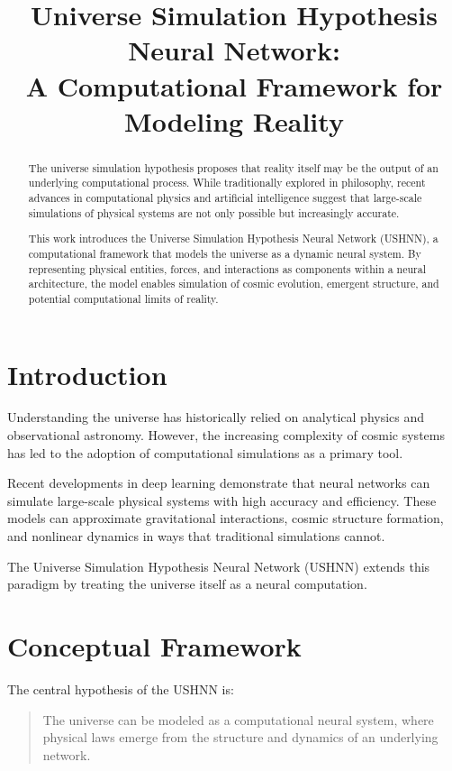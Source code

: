\documentclass[12pt]{article}
\title{\textbf{Universe Simulation Hypothesis Neural Network: \\ A Computational Framework for Modeling Reality}}
\author{}
\date{}
\begin{document}
\maketitle

\begin{abstract}
The universe simulation hypothesis proposes that reality itself may be the output of an underlying computational process. While traditionally explored in philosophy, recent advances in computational physics and artificial intelligence suggest that large-scale simulations of physical systems are not only possible but increasingly accurate.

This work introduces the Universe Simulation Hypothesis Neural Network (USHNN), a computational framework that models the universe as a dynamic neural system. By representing physical entities, forces, and interactions as components within a neural architecture, the model enables simulation of cosmic evolution, emergent structure, and potential computational limits of reality.
\end{abstract}

\section{Introduction}

Understanding the universe has historically relied on analytical physics and observational astronomy. However, the increasing complexity of cosmic systems has led to the adoption of computational simulations as a primary tool.

Recent developments in deep learning demonstrate that neural networks can simulate large-scale physical systems with high accuracy and efficiency. These models can approximate gravitational interactions, cosmic structure formation, and nonlinear dynamics in ways that traditional simulations cannot.

The Universe Simulation Hypothesis Neural Network (USHNN) extends this paradigm by treating the universe itself as a neural computation.

\section{Conceptual Framework}

The central hypothesis of the USHNN is:

\begin{quote}
The universe can be modeled as a computational neural system, where physical laws emerge from the structure and dynamics of an underlying network.
\end{quote}
\end{document}
